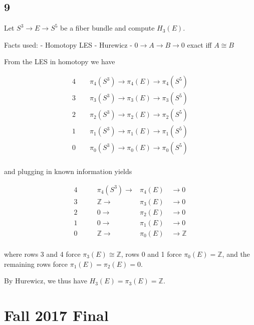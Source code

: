 \hypertarget{section-13}{%
\subsection{9}\label{section-13}}

Let \(S^3 \to E \to S^5\) be a fiber bundle and compute \(H_3(E)\).

\begin{solution}

Facts used: - Homotopy LES - Hurewicz - \(0\to A\to B \to 0\) exact iff
\(A\cong B\)

From the LES in homotopy we have

\begin{align} 4\qquad \pi_4(S^3) \to \pi_4(E) \to \pi_4(S^5) \\ 3\qquad \pi_3(S^3) \to \pi_3(E) \to \pi_3(S^5) \\ 2\qquad \pi_2(S^3) \to \pi_2(E) \to \pi_2(S^5) \\ 1\qquad \pi_1(S^3) \to \pi_1(E) \to \pi_1(S^5) \\ 0\qquad \pi_0(S^3) \to \pi_0(E) \to \pi_0(S^5) \\ \end{align}

and plugging in known information yields

\begin{align} 4\qquad &\pi_4(S^3) \to &\pi_4(E) \quad \to 0 \\ 3\qquad &{\mathbb{Z}}\to &\pi_3(E) \quad\to 0 \\ 2\qquad &0 \to &\pi_2(E) \quad\to 0 \\ 1\qquad &0 \to &\pi_1(E) \quad\to 0 \\ 0\qquad &{\mathbb{Z}}\to &\pi_0(E) \quad\to {\mathbb{Z}}\\ \end{align}

where rows 3 and 4 force \(\pi_3(E) \cong {\mathbb{Z}}\), rows 0 and 1
force \(\pi_0(E) = {\mathbb{Z}}\), and the remaining rows force
\(\pi_1(E) = \pi_2(E) = 0\).

By Hurewicz, we thus have \(H_3(E) = \pi_3(E) = {\mathbb{Z}}\).

\end{solution}

\hypertarget{fall-2017-final}{%
\section{Fall 2017 Final}\label{fall-2017-final}}

